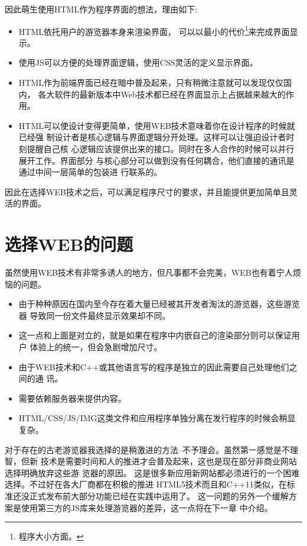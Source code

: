 因此萌生使用HTML作为程序界面的想法，理由如下:
\begin{itemize}
	\item HTML依托用户的游览器本身来渲染界面，
		可以以最小的代价\footnote{程序大小方面。}来完成界面显示。
	\item 使用JS可以方便的处理界面逻辑，使用CSS灵活的定义显示界面。
	\item HTML作为前端界面已经在暗中普及起来，只有稍微注意就可以发现仅仅国内，
		各大软件的最新版本中Web技术都已经在界面显示上占据越来越大的作用。
	\item HTML可以使设计变得更简单，使用WEB技术意味着你在设计程序的时候就已经强
		制设计者是核心逻辑与界面逻辑分开处理。这样可以让强迫设计者时刻提醒自己核
		心逻辑应该提供出来的接口。同时在多人合作的时候可以并行展开工作。界面部分
		与核心部分可以做到没有任何耦合，他们直接的通讯是通过中间一层简单的包装进
		行联系的。
\end{itemize}
因此在选择WEB技术之后，可以满足程序尺寸的要求，并且能提供更加简单且灵活的界面。

\section{选择WEB的问题}

虽然使用WEB技术有非常多诱人的地方，但凡事都不会完美，WEB也有着宁人烦恼的问题。
\begin{itemize}
	\item 由于种种原因在国内至今存在着大量已经被其开发者淘汰的游览器，这些游览器
		导致同一份文件最终显示效果却不同。
	\item 这一点和上面是对立的，就是如果在程序中内嵌自己的渲染部分则可以保证用户
		体验上的统一，但会急剧增加尺寸。
	\item 由于WEB技术和C++或其他语言写的程序是独立的因此需要自己处理他们之间的通
		讯。
	\item 需要依赖服务器来提供内容。
	\item HTML/CSS/JS/IMG这类文件和应用程序单独分离在发行程序的时候会稍显复杂。
\end{itemize}

对于存在的古老游览器我选择的是稍激进的方法--不予理会。虽然第一感觉是不理智，但新
技术是需要时间和人的推进才会普及起来，这也是现在部分非商业网站选择明确放弃这些游
览器的原因。
这是很多新应用新网站都必须进行的一个困难选择。不过好在各大厂商都在积极的推进
HTML5技术而且和C++11类似，在标准还没正式发布前大部分功能已经在实践中运用了。
这一问题的另外一个缓解方案是使用第三方的JS库来处理游览器的差异，这一点将在下一章
中介绍。

